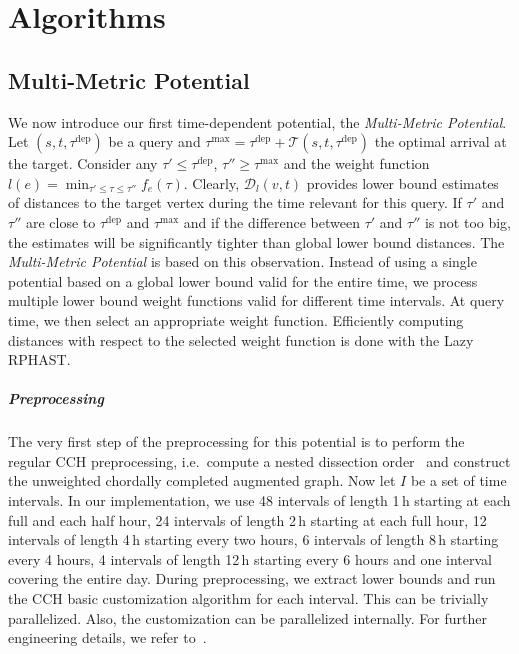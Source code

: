 \documentclass[a4paper,UKenglish,cleveref, autoref, thm-restate]{lipics-v2021}
\newcommand*{\pred}{f}
\newcommand*{\opttt}{\mathcal{T}}
\newcommand*{\dist}{\mathcal{D}}
\newcommand*{\tdep}{\tau^{\operatorname{dep}}}
\newcommand*{\tmax}{\tau^{\max}}
\begin{document}
\section{Algorithms}

\subsection{Multi-Metric Potential}

We now introduce our first time-dependent potential, the \emph{Multi-Metric Potential}.
Let $(s,t,\tdep)$ be a query and $\tmax = \tdep + \opttt(s,t,\tdep)$ the optimal arrival at the target.
Consider any $\tau' \leq \tdep$, $\tau'' \geq \tmax$ and the weight function $l(e) = \min_{\tau' \leq \tau \leq \tau''}\pred_e(\tau)$.
Clearly, $\dist_{l}(v,t)$ provides lower bound estimates of distances to the target vertex during the time relevant for this query.
If $\tau'$ and $\tau''$ are close to $\tdep$ and $\tmax$ and if the difference between $\tau'$ and $\tau''$ is not too big, the estimates will be significantly tighter than global lower bound distances.
The \emph{Multi-Metric Potential} is based on this observation.
Instead of using a single potential based on a global lower bound valid for the entire time, we process multiple lower bound weight functions valid for different time intervals.
At query time, we then select an appropriate weight function.
Efficiently computing distances with respect to the selected weight function is done with the Lazy RPHAST.

\subparagraph{Preprocessing}
The very first step of the preprocessing for this potential is to perform the regular CCH preprocessing, i.e.\ compute a nested dissection order~\cite{ghuw-fbndocch-19} and construct the unweighted chordally completed augmented graph.
Now let $I$ be a set of time intervals.
In our implementation, we use 48 intervals of length 1\,h starting at each full and each half hour, 24 intervals of length 2\,h starting at each full hour, 12 intervals of length 4\,h starting every two hours, 6 intervals of length 8\,h starting every 4 hours, 4 intervals of length 12\,h starting every 6 hours and one interval covering the entire day.
During preprocessing, we extract lower bounds and run the CCH basic customization algorithm for each interval.
This can be trivially parallelized.
Also, the customization can be parallelized internally.
For further engineering details, we refer to~\cite{dsw-cch-15,bsw-rttau-19}.
\end{document}
